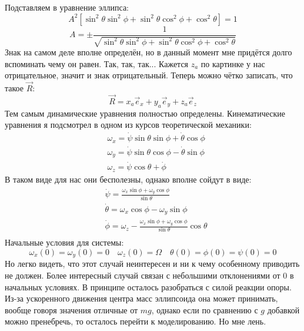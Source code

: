 Подставляем в уравнение эллипса:
\[
	A^2[\sin^2 \theta \sin^2 \phi + \sin^2 \theta \cos^2 \phi + \cos^2 \theta] = 1
\]
\[
	A = \pm \frac{1}{\sqrt{\sin^2 \theta \sin^2 \phi + \sin^2 \theta \cos^2 \phi + \cos^2 \theta}}
\]
Знак на самом деле вполне определён, но в данный момент мне придётся долго вспоминать чему он равен. Так, так, так... Кажется $z_a$ по картинке у нас отрицательное, значит и знак отрицательный. Теперь можно чётко записать, что такое $\vec{R}$:
\[
	\vec{R} = x_a \vec{e}_x + y_a \vec{e}_y + z_a \vec{e}_z
\]
Тем самым динамические уравнения полностью определены. Кинематические уравнения я подсмотрел в одном из курсов теоретической механики:
\[
	\begin{aligned}
	& \omega_x = \dot{\psi} \sin \theta \sin \phi + \dot{\theta} \cos \phi \\
	& \omega_y = \dot{\psi} \sin \theta \cos \phi - \dot{\theta} \sin \phi \\
	& \omega_z = \dot{\psi} \cos \theta + \dot{\phi}
	\end{aligned}
\]
В таком виде для нас они бесполезны, однако вполне сойдут в виде:
\[
	\begin{aligned}
	& \dot{\psi} = \frac{\omega_x \sin \phi + \omega_y \cos \phi}{\sin \theta} \\
	& \dot{\theta} = \omega_x \cos \phi - \omega_y \sin \phi \\
	& \dot{\phi} = \omega_z - \frac{\omega_x \sin \phi + \omega_y \cos \phi}{\sin \theta} \cos \theta \\
	\end{aligned}
\]
Начальные условия для системы:
\[
	\omega_x(0) = \omega_y(0) = 0
	\quad
	\omega_z(0) = \Omega 
	\quad
	\theta(0) = \phi(0) = \psi(0) = 0 
\]
Но легко видеть, что этот случай неинтересен и ни к чему особенному приводить не должен. Более интересный случай связан с небольшими отклонениями от 0 в начальных условиях. В принципе осталось разобраться с силой реакции опоры. Из-за ускоренного движения центра масс эллипсоида она может принимать, вообще говоря значения отличные от $mg$, однако если по сравнению с $g$ добавкой можно пренебречь, то осталось перейти к моделированию. Но мне лень.